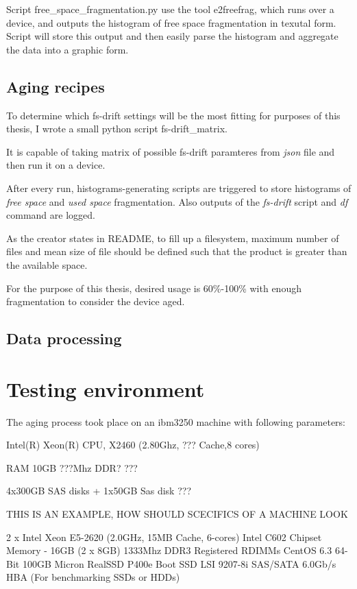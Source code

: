 \documentclass[
  color, %
  table, %
  lof,   %
  lot,   %
]{fithesis3}
\begin{document}
Script free\_space\_fragmentation.py use the tool e2freefrag, which runs over a device, and outputs the histogram of free space fragmentation in texutal form. Script will store this output and then easily parse the histogram and aggregate the data into a graphic form.

\section{Aging recipes}
To determine which fs-drift settings will be the most fitting for purposes of this thesis, I wrote a small python script fs-drift\_matrix.

It is capable of taking matrix of possible fs-drift paramteres from \textit{json} file and then run it on a device.

After every run, histograms-generating scripts are triggered to store histograms of \textit{free space} and \textit{used space} fragmentation. Also outputs of the \textit{fs-drift} script and \textit{df} command are logged.

As the creator states in README, to fill up a filesystem, maximum number of files and mean size of file should be defined such that the product is greater than the available space.

For the purpose of this thesis, desired usage is 60\%-100\% with enough fragmentation to consider the device aged.

\section{Data processing}
\chapter{Testing environment}
The aging process took place on an ibm3250 machine with following parameters:
\begin{compactenum}
  \item Intel(R) Xeon(R) CPU, X2460 (2.80Ghz, ??? Cache,8 cores)
  \item RAM 10GB ???Mhz DDR? ???
  \item 4x300GB SAS disks + 1x50GB Sas disk ???
\end{compactenum}

THIS IS AN EXAMPLE, HOW SHOULD SCECIFICS OF A MACHINE LOOK

2 x Intel Xeon E5-2620 (2.0GHz, 15MB Cache, 6-cores)
Intel C602 Chipset
Memory - 16GB (2 x 8GB) 1333Mhz DDR3 Registered RDIMMs
 CentOS 6.3 64-Bit
100GB Micron RealSSD P400e Boot SSD
LSI 9207-8i SAS/SATA 6.0Gb/s HBA (For benchmarking SSDs or HDDs)
\end{document}
